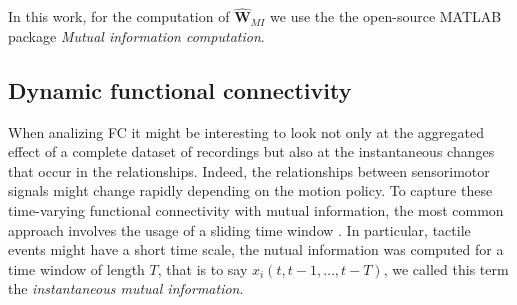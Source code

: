 
In this work, for the computation of $\hat{\bm{W}}_{MI}  $ we use the the open-source MATLAB package \emph{Mutual information computation}\cite{PengMutualInformationcomputation}.

\subsection{Dynamic functional connectivity}
When analizing FC it might be interesting to look not only at the aggregated effect of a complete dataset of recordings but also at the instantaneous changes that occur in the relationships. Indeed, the relationships between sensorimotor signals might change rapidly depending on the motion policy. To capture these time-varying functional connectivity with mutual information, the most common approach involves the usage of a sliding time window \cite{Preti2017dynamicfunctionalconnectome}. In particular, tactile events might have a short time scale, the nutual information was computed for a time window of length $T$, that is to say $x_i(t, t-1,\ldots, t-T)$, we called this term the \emph{instantaneous mutual information}.

